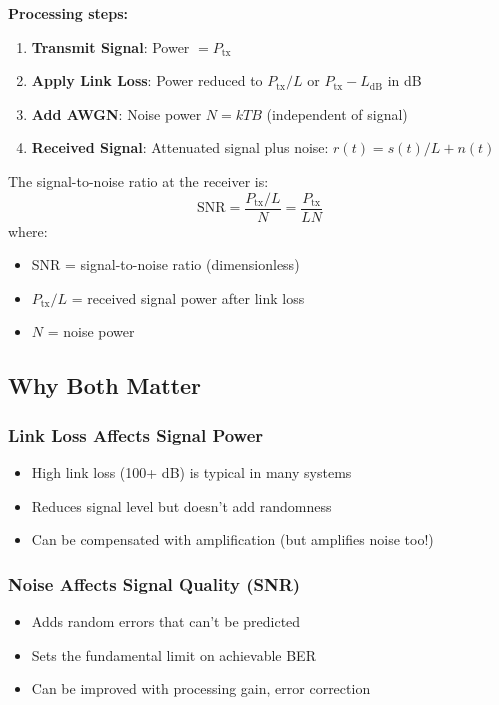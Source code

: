\textbf{Processing steps:}
\begin{enumerate}
\item \textbf{Transmit Signal}: Power $= P_{\text{tx}}$
\item \textbf{Apply Link Loss}: Power reduced to $P_{\text{tx}} / L$ or $P_{\text{tx}} - L_{\text{dB}}$ in dB
\item \textbf{Add AWGN}: Noise power $N = kTB$ (independent of signal)
\item \textbf{Received Signal}: Attenuated signal plus noise: $r(t) = s(t)/L + n(t)$
\end{enumerate}

The signal-to-noise ratio at the receiver is:
\begin{equation}
\text{SNR} = \frac{P_{\text{tx}}/L}{N} = \frac{P_{\text{tx}}}{LN}
\end{equation}
where:
\begin{itemize}
\item SNR = signal-to-noise ratio (dimensionless)
\item $P_{\text{tx}}/L$ = received signal power after link loss
\item $N$ = noise power
\end{itemize}

\subsection{Why Both Matter}\label{why-both-matter}

\subsubsection{Link Loss Affects Signal Power}\label{link-loss-affects-signal-power}

\begin{itemize}
\item High link loss (100+ dB) is typical in many systems
\item Reduces signal level but doesn't add randomness
\item Can be compensated with amplification (but amplifies noise too!)
\end{itemize}

\subsubsection{Noise Affects Signal Quality (SNR)}\label{noise-affects-signal-quality-snr}

\begin{itemize}
\item Adds random errors that can't be predicted
\item Sets the fundamental limit on achievable BER
\item Can be improved with processing gain, error correction
\end{itemize}

